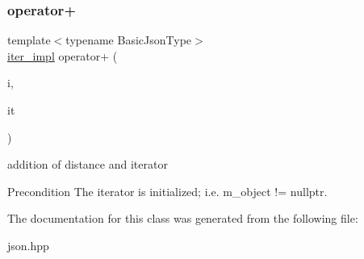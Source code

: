 \subsubsection{\texorpdfstring{operator+}{operator+}}
{\footnotesize\ttfamily template$<$typename Basic\+Json\+Type$>$ \\
\mbox{\hyperlink{classnlohmann_1_1detail_1_1iter__impl}{iter\+\_\+impl}} operator+ (\begin{DoxyParamCaption}\item[{\mbox{\hyperlink{classnlohmann_1_1detail_1_1iter__impl_a2f7ea9f7022850809c60fc3263775840}{difference\+\_\+type}}}]{i,  }\item[{const \mbox{\hyperlink{classnlohmann_1_1detail_1_1iter__impl}{iter\+\_\+impl}}$<$ Basic\+Json\+Type $>$ \&}]{it }\end{DoxyParamCaption})\hspace{0.3cm}{\ttfamily [friend]}}



addition of distance and iterator 

\begin{DoxyPrecond}{Precondition}
The iterator is initialized; i.\+e. {\ttfamily m\+\_\+object != nullptr}. 
\end{DoxyPrecond}


The documentation for this class was generated from the following file\+:\begin{DoxyCompactItemize}
\item 
json.\+hpp\end{DoxyCompactItemize}
